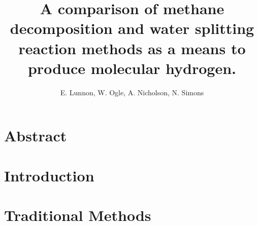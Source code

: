 \documentclass[a4paper]{article}
\title{A comparison of methane decomposition and water splitting reaction methods as a means to produce molecular hydrogen.}
\author{E. Lunnon, W. Ogle, A. Nicholson, N. Simons}
\begin{document}
\maketitle
\tableofcontents
\clearpage

\begin{multicols}{2}
\section*{Abstract}%
\label{sec:abstract}
\clearpage

\section{Introduction}%
\label{sec:introduction}




\section{Traditional Methods}%
\label{sub:Traditional_Methods}






\end{multicols}
\end{document}
